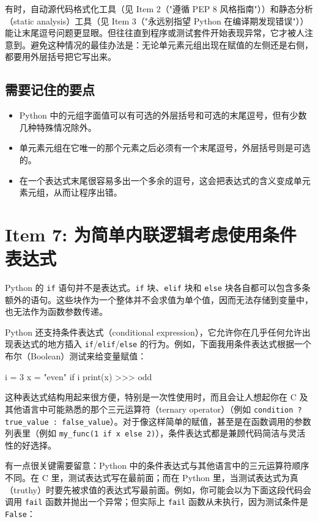 有时，自动源代码格式化工具（见 Item 2（"遵循 PEP 8 风格指南"））和静态分析（static analysis）工具（见 Item 3（"永远别指望 Python 在编译期发现错误"））能让末尾逗号问题更显眼。但往往直到程序或测试套件开始表现异常，它才被人注意到。避免这种情况的最佳办法是：无论单元素元组出现在赋值的左侧还是右侧，都要用外层括号把它写出来。

\subsection{需要记住的要点}

\begin{itemize}
\item Python 中的元组字面值可以有可选的外层括号和可选的末尾逗号，但有少数几种特殊情况除外。
\item 单元素元组在它唯一的那个元素之后必须有一个末尾逗号，外层括号则是可选的。
\item 在一个表达式末尾很容易多出一个多余的逗号，这会把表达式的含义变成单元素元组，从而让程序出错。
\end{itemize}

\section{Item 7: 为简单内联逻辑考虑使用条件表达式}

Python 的 \texttt{if} 语句并不是表达式。\texttt{if} 块、\texttt{elif} 块和 \texttt{else} 块各自都可以包含多条额外的语句。这些块作为一个整体并不会求值为单个值，因而无法存储到变量中，也无法作为函数参数传递。

Python 还支持条件表达式（conditional expression），它允许你在几乎任何允许出现表达式的地方插入 \texttt{if}/\texttt{elif}/\texttt{else} 的行为。例如，下面我用条件表达式根据一个布尔（Boolean）测试来给变量赋值：

\begin{codebox}[python]
i = 3
x = "even" if i %
print(x)
>>>
odd
\end{codebox}

这种表达式结构用起来很方便，特别是一次性使用时，而且会让人想起你在 C 及其他语言中可能熟悉的那个三元运算符（ternary operator）（例如 \texttt{condition ? true\_value : false\_value}）。对于像这样简单的赋值，甚至是在函数调用的参数列表里（例如 \texttt{my\_func(1 if x else 2)}），条件表达式都是兼顾代码简洁与灵活性的好选择。

有一点很关键需要留意：Python 中的条件表达式与其他语言中的三元运算符顺序不同。在 C 里，测试表达式写在最前面；而在 Python 里，当测试表达式为真（truthy）时要先被求值的表达式写最前面。例如，你可能会以为下面这段代码会调用 \texttt{fail} 函数并抛出一个异常；但实际上 \texttt{fail} 函数从未执行，因为测试条件是 \texttt{False}：


